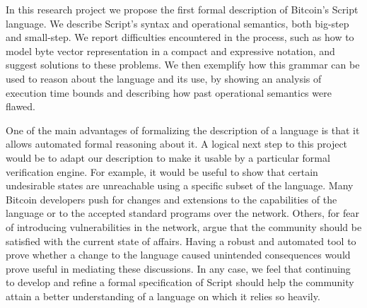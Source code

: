 \documentclass[letterpaper, 10 pt, conference]{ieeeconf}
\begin{document}
In this research project we propose the first formal description of Bitcoin's Script language. We describe Script's syntax and operational semantics, both big-step and small-step. We report difficulties encountered in the process, such as how to model byte vector representation in a compact and expressive notation, and suggest solutions to these problems. We then exemplify how this grammar can be used to reason about the language and its use, by showing an analysis of execution time bounds and describing how past operational semantics were flawed.

One of the main advantages of formalizing the description of a language is that it allows automated formal reasoning about it. A logical next step to this project would be to adapt our description to make it usable by a particular formal verification engine. For example, it would be useful to show that certain undesirable states are unreachable using a specific subset of the language. Many Bitcoin developers push for changes and extensions to the capabilities of the language or to the accepted standard programs over the network. Others, for fear of introducing vulnerabilities in the network, argue that the community should be satisfied with the current state of affairs. Having a robust and automated tool to prove whether a change to the language caused unintended consequences would prove useful in mediating these discussions. In any case, we feel that continuing to develop and refine a formal specification of Script should help the community attain a better understanding of a language on which it relies so heavily.





\addtolength{\textheight}{-12cm}   %

\end{document}
